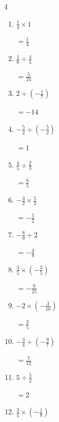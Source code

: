 \begin{multicols}{4}
\begin{enumerate}
        $\displaystyle =-\frac{5}{9}$

  \item $\displaystyle \frac{1}{4}\times{}1$

        $\displaystyle =\frac{1}{4}$

  \item $\displaystyle \frac{1}{6}\div{}\frac{4}{5}$

        $\displaystyle =\frac{5}{24}$

  \item $\displaystyle 2\div{}\left(-\frac{1}{7}\right)$

        $\displaystyle =-14$

\columnbreak %

  \item $\displaystyle -\frac{5}{2}\div{}\left(-\frac{5}{2}\right)$

        $\displaystyle =1$

  \item $\displaystyle \frac{4}{5}\div{}\frac{2}{3}$

        $\displaystyle =\frac{6}{5}$

  \item $\displaystyle -\frac{3}{2}\times{}\frac{5}{3}$

        $\displaystyle =-\frac{5}{2}$

  \item $\displaystyle -\frac{8}{9}\div{}2$

        $\displaystyle =-\frac{4}{9}$

  \item $\displaystyle \frac{3}{5}\times{}\left(-\frac{3}{5}\right)$

        $\displaystyle =-\frac{9}{25}$

  \item $\displaystyle -2\times{}\left(-\frac{3}{10}\right)$

        $\displaystyle =\frac{3}{5}$

  \item $\displaystyle -\frac{3}{4}\div{}\left(-\frac{9}{7}\right)$

        $\displaystyle =\frac{7}{12}$

  \item $\displaystyle 5\div{}\frac{5}{2}$

        $\displaystyle =2$

  \item $\displaystyle \frac{3}{5}\times{}\left(-\frac{1}{8}\right)$


\end{enumerate}
\end{multicols}

